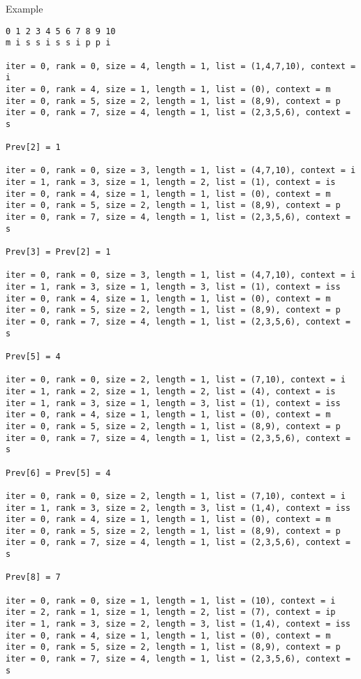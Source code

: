 \documentclass{article}
\begin{document}
Example

\begin{verbatim}
0 1 2 3 4 5 6 7 8 9 10
m i s s i s s i p p i

iter = 0, rank = 0, size = 4, length = 1, list = (1,4,7,10), context = i
iter = 0, rank = 4, size = 1, length = 1, list = (0), context = m
iter = 0, rank = 5, size = 2, length = 1, list = (8,9), context = p
iter = 0, rank = 7, size = 4, length = 1, list = (2,3,5,6), context = s

Prev[2] = 1

iter = 0, rank = 0, size = 3, length = 1, list = (4,7,10), context = i
iter = 1, rank = 3, size = 1, length = 2, list = (1), context = is
iter = 0, rank = 4, size = 1, length = 1, list = (0), context = m
iter = 0, rank = 5, size = 2, length = 1, list = (8,9), context = p
iter = 0, rank = 7, size = 4, length = 1, list = (2,3,5,6), context = s

Prev[3] = Prev[2] = 1

iter = 0, rank = 0, size = 3, length = 1, list = (4,7,10), context = i
iter = 1, rank = 3, size = 1, length = 3, list = (1), context = iss
iter = 0, rank = 4, size = 1, length = 1, list = (0), context = m
iter = 0, rank = 5, size = 2, length = 1, list = (8,9), context = p
iter = 0, rank = 7, size = 4, length = 1, list = (2,3,5,6), context = s

Prev[5] = 4

iter = 0, rank = 0, size = 2, length = 1, list = (7,10), context = i
iter = 1, rank = 2, size = 1, length = 2, list = (4), context = is
iter = 1, rank = 3, size = 1, length = 3, list = (1), context = iss
iter = 0, rank = 4, size = 1, length = 1, list = (0), context = m
iter = 0, rank = 5, size = 2, length = 1, list = (8,9), context = p
iter = 0, rank = 7, size = 4, length = 1, list = (2,3,5,6), context = s

Prev[6] = Prev[5] = 4

iter = 0, rank = 0, size = 2, length = 1, list = (7,10), context = i
iter = 1, rank = 3, size = 2, length = 3, list = (1,4), context = iss
iter = 0, rank = 4, size = 1, length = 1, list = (0), context = m
iter = 0, rank = 5, size = 2, length = 1, list = (8,9), context = p
iter = 0, rank = 7, size = 4, length = 1, list = (2,3,5,6), context = s

Prev[8] = 7

iter = 0, rank = 0, size = 1, length = 1, list = (10), context = i
iter = 2, rank = 1, size = 1, length = 2, list = (7), context = ip
iter = 1, rank = 3, size = 2, length = 3, list = (1,4), context = iss
iter = 0, rank = 4, size = 1, length = 1, list = (0), context = m
iter = 0, rank = 5, size = 2, length = 1, list = (8,9), context = p
iter = 0, rank = 7, size = 4, length = 1, list = (2,3,5,6), context = s


\end{verbatim}
\end{document}
